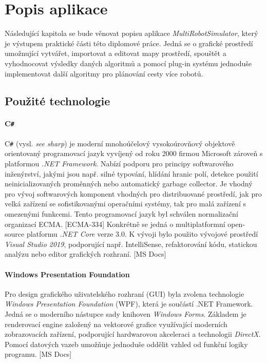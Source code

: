 \chapter{Popis aplikace}
Následující kapitola se bude věnovat popisu aplikace \emph{MultiRobotSimulator}, který je výstupem praktické části této diplomové práce. Jedná se o grafické prostředí umožnující vytvářet, importovat a editovat mapy prostředí, spouštět a vyhodnocovat výsledky daných algoritmů a pomocí plug-in systému jednoduše implementovat další algoritmy pro plánování cesty více robotů.

\section{Použité technologie}
\subsubsection{C\texttt{\#}}
C\texttt{\#} (vysl. \emph{see sharp}) je moderní mnohoúčelový vysokoúrovňový objektově orientovaný programovací jazyk vyvíjený od roku 2000 firmou Microsoft zároveň s platformou \emph{.NET Framework}. Nabízí podporu pro principy softwarového inženýrství, jakými jsou např. silné typování, hlídání hranic polí, detekce použití neinicializovaných proměnných nebo automatický garbage collector. Je vhodný pro vývoj softwarových komponent vhodných pro distribuované prostředí, jak pro velká zařízení se sofistikovanými operačními systémy, tak pro malá zařízení s omezenými funkcemi. Tento programovací jazyk byl schválen normalizační organizací ECMA. [ECMA-334] Konkrétně se jedná o multiplatformní open-source platformu \emph{.NET Core} verze 3.0. K vývoji bylo použito vývojové prostředí \emph{Visual Studio 2019}, podporující např. IntelliSense, refaktorování kódu, statickou analýzu nebo editor grafických rozhraní. [MS Docs]

\subsubsection{Windows Presentation Foundation}
Pro design grafického uživatelského rozhraní (GUI) byla zvolena technologie \emph{Windows Presentation Foundation} (WPF), která je součástí .NET Framework. Jedná se o moderního nástupce sady knihoven \emph{Windows Forms}. Základem je renderovací engine založený na vektorové grafice využívající moderních zobrazovacích zařízení, podporující hardwarovou akceleraci a technologii \emph{DirectX}. Pomocí datových vazeb umožňuje jednoduše oddělit vzhled od funkční logiky programu. [MS Docs]

